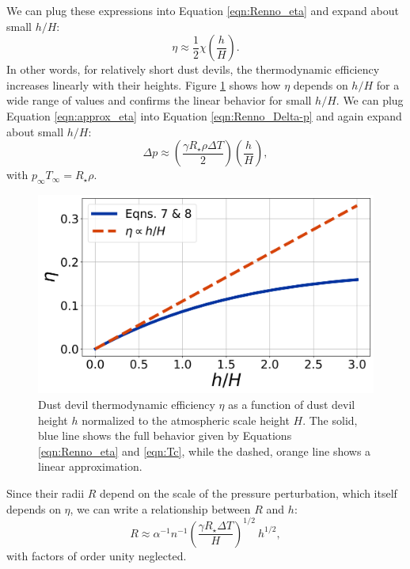 \documentclass{aastex63}
\begin{document}
We can plug these expressions into Equation \ref{eqn:Renno_eta} and expand about small $h/H$:
\begin{equation}
    \eta \approx \frac{1}{2} \chi \left( \dfrac{h}{H} \right).\label{eqn:approx_eta}
\end{equation}
In other words, for relatively short dust devils, the thermodynamic efficiency increases linearly with their heights. Figure \ref{fig:eta_vs_h-over-H} shows how $\eta$ depends on $h/H$ for a wide range of values and confirms the linear behavior for small $h/H$. We can plug Equation \ref{eqn:approx_eta} into Equation \ref{eqn:Renno_Delta-p} and again expand about small $h/H$:
\begin{equation}
    \Delta p \approx \left( \dfrac{\gamma R_\star \rho \Delta T}{2} \right) \left( \dfrac{h}{H} \right) \label{eqn:approx_Delta-p},
\end{equation}
with $p_\infty T_\infty = R_\star \rho$.

\begin{figure}
    \centering
    \includegraphics[width=\textwidth]{eta_vs_h-over-H.png}
    \caption{Dust devil thermodynamic efficiency $\eta$ as a function of dust devil height $h$ normalized to the atmospheric scale height $H$. The solid, blue line shows the full behavior given by Equations \ref{eqn:Renno_eta} and \ref{eqn:Tc}, while the dashed, orange line shows a linear approximation.}
    \label{fig:eta_vs_h-over-H}
\end{figure}

Since their radii $R$ depend on the scale of the pressure perturbation, which itself depends on $\eta$, we can write a relationship between $R$ and $h$:
\begin{equation}
    R \approx \alpha^{-1} n^{-1} \left( \dfrac{\gamma R_\star \Delta T}{H} \right)^{1/2}\ h^{1/2},\label{eqn:R_vs_h}
\end{equation}
with factors of order unity neglected.
\end{document}
